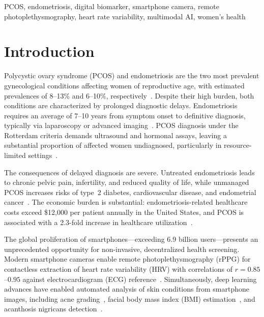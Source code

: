 \documentclass[conference]{IEEEtran}
\begin{document}
\begin{IEEEkeywords}
PCOS, endometriosis, digital biomarker, smartphone camera, remote photoplethysmography, heart rate variability, multimodal AI, women's health
\end{IEEEkeywords}

\section{Introduction}

Polycystic ovary syndrome (PCOS) and endometriosis are the two most prevalent gynecological conditions affecting women of reproductive age, with estimated prevalences of 8--13\% and 6--10\%, respectively~\cite{Wang_2025, Pavic_2025}. Despite their high burden, both conditions are characterized by prolonged diagnostic delays. Endometriosis requires an average of 7--10 years from symptom onset to definitive diagnosis, typically via laparoscopy or advanced imaging~\cite{Zhang_2026}. PCOS diagnosis under the Rotterdam criteria demands ultrasound and hormonal assays, leaving a substantial proportion of affected women undiagnosed, particularly in resource-limited settings~\cite{Arabkermani_2025}.

The consequences of delayed diagnosis are severe. Untreated endometriosis leads to chronic pelvic pain, infertility, and reduced quality of life, while unmanaged PCOS increases risks of type~2 diabetes, cardiovascular disease, and endometrial cancer~\cite{Wang_2025}. The economic burden is substantial: endometriosis-related healthcare costs exceed \$12,000 per patient annually in the United States, and PCOS is associated with a 2.3-fold increase in healthcare utilization~\cite{Moghimikandelousi_2025}.

The global proliferation of smartphones---exceeding 6.9 billion users---presents an unprecedented opportunity for non-invasive, decentralized health screening. Modern smartphone cameras enable remote photoplethysmography (rPPG) for contactless extraction of heart rate variability (HRV) with correlations of $r=0.85$--$0.95$ against electrocardiogram (ECG) reference~\cite{rppgreview2024frontiers}. Simultaneously, deep learning advances have enabled automated analysis of skin conditions from smartphone images, including acne grading~\cite{Huynh_2022}, facial body mass index (BMI) estimation~\cite{Yousaf_2021}, and acanthosis nigricans detection~\cite{Dhanoo_2024}.
\end{document}
